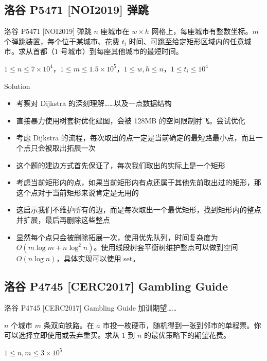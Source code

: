 ﻿\documentclass[aspectratio=169]{ctexbeamer}
\begin{document}
\subsection{洛谷 P5471 [NOI2019] 弹跳}

\begin{frame}{洛谷 P5471 [NOI2019] 弹跳}
      $n$ 座城市在 $w\times h$ 网格上，每座城市有整数坐标。$m$ 个弹跳装置，每个位于某城市、花费 $t_i$ 时间、可跳至给定矩形区域内的任意城市。求从首都（$1$ 号城市）到每座其他城市的最短时间。
      
      $1\le n\le 7\times 10^4$，$1\le m\le 1.5\times 10^5$，$1\le w,h\le n$，$1\le t_i\le 10^4$
\end{frame}

\begin{frame}{Solution}
    \begin{itemize}
        \item 考察对 Dijkstra 的深刻理解……以及一点数据结构
        \item 直接暴力使用树套树优化建图，会被 128MB 的空间限制肘飞。尝试优化
        \item 考虑 Dijkstra 的流程，每次取出的点一定是当前确定的最短路最小点，而且一个点只会被取出拓展一次
        \item 这个题的建边方式首先保证了，每次我们取出的实际上是一个矩形
        \item 考虑当前矩形内的点，如果当前矩形内有点还属于其他先前取出过的矩形，那这个点对于当前矩形来说肯定是无用的
        \item 这启示我们不维护所有的边，而是每次取出一个最优矩形，找到矩形内的整点并扩展，最后再删除这些整点
        \item 显然每个点只会被删除拓展一次，使用优先队列，时间复杂度为 $O(m\log m+n\log^2 n)$。使用线段树套平衡树维护整点可以做到空间 $O(n\log n)$，具体实现可以使用 set。
    \end{itemize}
\end{frame}


\subsection{洛谷 P4745 [CERC2017] Gambling Guide}

\begin{frame}{洛谷 P4745 [CERC2017] Gambling Guide}
    加训期望……

    $n$ 个城市 $m$ 条双向铁路。在 $a$ 市投一枚硬币，随机得到一张到邻市的单程票。你可以选择立即使用或丢弃重买。求从 $1$ 到 $n$ 的最优策略下的期望花费。

    $1\le n,m\le 3\times 10^5$
\end{frame}
\end{document}
